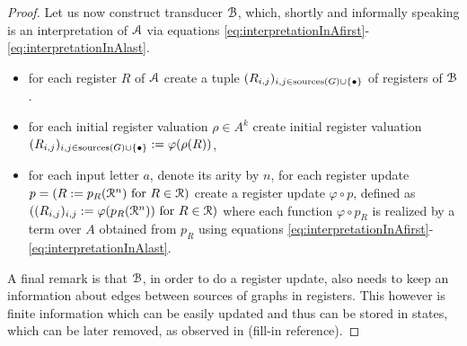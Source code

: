 \begin{proof}
	Let us now construct transducer ${\mathcal B}$, which, shortly and informally speaking is an interpretation of ${\mathcal A}$ via equations \eqref{eq:interpretationInAfirst}-\eqref{eq:interpretationInAlast}.
	\begin{itemize}
		\item for each register $R$ of ${\mathcal A}$ create a tuple $(R_{i,j})_{i, j \in \operatorname{sources}(G) \cup \{\bullet\}}$ of registers of ${\mathcal B}$.
		\item for each initial register valuation $\rho \in A^k$ create initial register valuation $(R_{i,j})_{i,j\in\operatorname{sources}(G) \cup \{\bullet\}} := \varphi(\rho(R))$,
		\item for each input letter $a$, denote its arity by $n$, for each register update $p = (R:= p_R(\mathcal{R}^n) \text{ for } R \in \mathcal{R})$ create a register update $\varphi\circ p$, defined as $((R_{i,j})_{i,j} := \varphi(p_R(\mathcal{R}^n)) \text{ for } R\in\mathcal{R})$ where each function $\varphi\circ p_R$ is realized by a term over $A$ obtained from $p_R$ using equations \eqref{eq:interpretationInAfirst}-\eqref{eq:interpretationInAlast}.
	\end{itemize}
	A final remark is that ${\mathcal B}$, in order to do a register update, also needs to keep an information about edges between sources of graphs in registers. This however is finite information which can be easily updated and thus can be stored in states, which can be later removed, as observed in (fill-in reference).
\end{proof}

